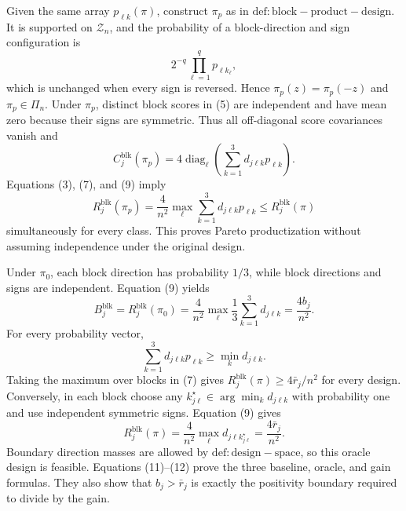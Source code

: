 Given the same array \(p_{\ell k}(\pi)\), construct \(\pi_p\) as in \(\mathrm{def:block-product-design}\).  It is supported on \(\mathcal Z_n\), and the probability of a block-direction and sign configuration is
\[
2^{-q}\prod_{\ell=1}^q p_{\ell k_\ell},
\tag{8}
\]
which is unchanged when every sign is reversed.  Hence \(\pi_p(z)=\pi_p(-z)\) and \(\pi_p\in\Pi_n\).  Under \(\pi_p\), distinct block scores in (5) are independent and have mean zero because their signs are symmetric.  Thus all off-diagonal score covariances vanish and
\[
C_j^{\mathrm{blk}}(\pi_p)
=4\operatorname{diag}_{\ell}
\left(\sum_{k=1}^3d_{j\ell k}p_{\ell k}\right).
\tag{9}
\]
Equations (3), (7), and (9) imply
\[
R_j^{\mathrm{blk}}(\pi_p)
=\frac4{n^2}\max_\ell\sum_{k=1}^3d_{j\ell k}p_{\ell k}
\le R_j^{\mathrm{blk}}(\pi)
\tag{10}
\]
simultaneously for every class.  This proves Pareto productization without assuming independence under the original design.

Under \(\pi_0\), each block direction has probability \(1/3\), while block directions and signs are independent.  Equation (9) yields
\[
B_j^{\mathrm{blk}}
=R_j^{\mathrm{blk}}(\pi_0)
=\frac4{n^2}\max_\ell\frac13\sum_{k=1}^3d_{j\ell k}
=\frac{4b_j}{n^2}.
\tag{11}
\]
For every probability vector,
\[
\sum_{k=1}^3d_{j\ell k}p_{\ell k}
\ge\min_k d_{j\ell k}.
\]
Taking the maximum over blocks in (7) gives \(R_j^{\mathrm{blk}}(\pi)\ge4\bar r_j/n^2\) for every design.  Conversely, in each block choose any \(k_{j\ell}^\star\in\arg\min_kd_{j\ell k}\) with probability one and use independent symmetric signs.  Equation (9) gives
\[
R_j^{\mathrm{blk}}(\pi)
=\frac4{n^2}\max_\ell d_{j\ell k_{j\ell}^\star}
=\frac{4\bar r_j}{n^2}.
\tag{12}
\]
Boundary direction masses are allowed by \(\mathrm{def:design-space}\), so this oracle design is feasible.  Equations (11)--(12) prove the three baseline, oracle, and gain formulas.  They also show that \(b_j>\bar r_j\) is exactly the positivity boundary required to divide by the gain.

